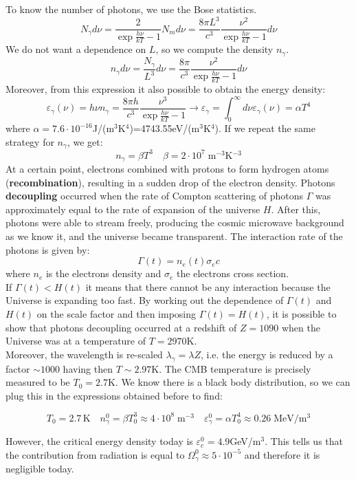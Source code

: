 \documentclass[10.75pt,a4paper,openright,bottom=2cm]{article}
\newcommand{\beginbox}[1]{\begin{tcolorbox}[width=\textwidth,colback={black!40},title={#1},colbacktitle={purple!55},coltitle=black]}
\renewcommand{\endbox}{\end{tcolorbox}\noindent}
\begin{document}
To know the number of photons, we use the Bose statistics.
\[
N_\gamma d\nu=\frac{2}{\exp{\frac{h\nu}{kT}}-1}N_md\nu=\frac{8\pi L^3}{c^3}\frac{\nu^2}{\exp{\frac{h\nu}{kT}}-1}d\nu
\]
We do not want a dependence on $L$, so we compute the density $n_\gamma$.
\[
n_\gamma d\nu=\frac{N_\gamma}{L^3}d\nu=\frac{8\pi}{c^3}\frac{\nu^2}{\exp{\frac{h\nu}{kT}}-1}d\nu
\]
Moreover, from this expression it also possible to obtain the energy density:
\[
\varepsilon_\gamma(\nu)=h\nu n_\gamma=\frac{8\pi h}{c^3}\frac{\nu^3}{\exp{\frac{h\nu}{kT}}-1}\to\varepsilon_\gamma=\int_0^\infty d\nu\varepsilon_\gamma(\nu)=\alpha T^4
\]
where $\alpha=7.6\cdot10^{-16}$\;J/(m$^3$K$^4$)=4743.55\;eV/(m$^3$K$^4$). If we repeat the same strategy for $n_\gamma$, we get:
\[
n_\gamma=\beta T^3 \quad \beta=2\cdot10^7\;\text{m$^{-3}$K$^{-3}$}
\]
At a certain point, electrons combined with protons to form hydrogen atoms (\textbf{recombination}), resulting in a sudden drop of the electron density. Photons \textbf{decoupling} occurred when the rate of Compton scattering of photons $\Gamma$ was approximately equal to the rate of expansion of the universe $H$. After this, photons were able to stream freely, producing the cosmic microwave background as we know it, and the universe became transparent. The interaction rate of the photons is given by:
\[
\Gamma(t)=n_e(t)\sigma_ec
\]
where $n_e$ is the electrons density and $\sigma_e$ the electrons cross section.\\
If $\Gamma(t)<H(t)$ it means that there cannot be any interaction because the Universe is expanding too fast. By working out the dependence of $\Gamma(t)$ and $H(t)$ on the scale factor and then imposing $\Gamma(t)=H(t)$, it is possible to show that photons decoupling occurred at a redshift of $Z=1090$ when the Universe was at a temperature of $T=2970$\;K.\\
Moreover, the wavelength is re-scaled $\lambda_\gamma=\lambda Z$, i.e. the energy is reduced by a factor $\sim1000$ having then $T\sim2.97$\;K. The CMB temperature is precisely measured to be $T_0=2.7$\;K. We know there is a black body distribution, so we can plug this in the expressions obtained before to find:
\beginbox{Density of Photons}
\[
T_0=2.7\,\text{K}\quad n_\gamma^0=\beta T_0^3\approx4\cdot10^8\;\text{m$^{-3}$} \quad \varepsilon_\gamma^0=\alpha T_0^4\approx0.26\;\text{MeV/m$^3$}
\]
\endbox
However, the critical energy density today is $\varepsilon_c^0=4.9$\;GeV/m$^3$. This tells us that the contribution from radiation is equal to $\Omega_\gamma^0\approx5\cdot10^{-5}$ and therefore it is negligible today.\\
\end{document}
